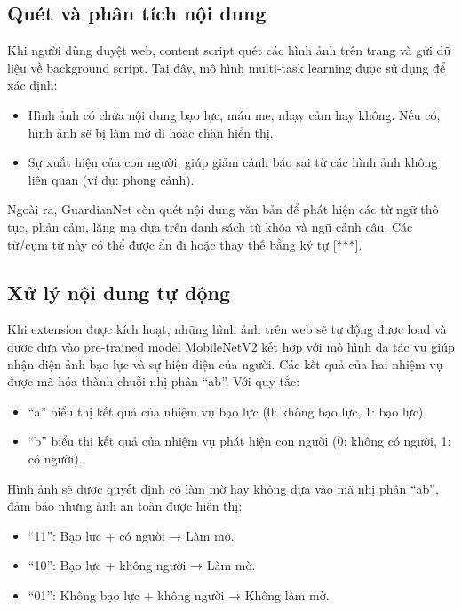\documentclass[12pt,a4paper]{article}
\begin{document}
\subsection{Quét và phân tích nội dung}

Khi người dùng duyệt web, content script quét các hình ảnh trên trang và gửi dữ liệu về background script. Tại đây, mô hình multi-task learning được sử dụng để xác định:

\begin{itemize}
  \item Hình ảnh có chứa nội dung bạo lực, máu me, nhạy cảm hay không. Nếu có, hình ảnh sẽ bị làm mờ đi hoặc chặn hiển thị.
  
  \item Sự xuất hiện của con người, giúp giảm cảnh báo sai từ các hình ảnh không liên quan (ví dụ: phong cảnh).
\end{itemize}

Ngoài ra, GuardianNet còn quét nội dung văn bản để phát hiện các từ ngữ thô tục, phản cảm, lăng mạ dựa trên danh sách từ khóa và ngữ cảnh câu. Các từ/cụm từ này có thể được ẩn đi hoặc thay thế bằng ký tự [***].

\subsection{Xử lý nội dung tự động}

Khi extension được kích hoạt, những hình ảnh trên web sẽ tự động được load và được đưa vào pre-trained model MobileNetV2 kết hợp với mô hình đa tác vụ giúp nhận diện ảnh bạo lực và sự hiện diện của người. Các kết quả của hai nhiệm vụ được mã hóa thành chuỗi nhị phân ``ab''. Với quy tắc:

\begin{itemize}
  \item ``a'' biểu thị kết quả của nhiệm vụ bạo lực (0: không bạo lực, 1: bạo lực).
  
  \item ``b'' biểu thị kết quả của nhiệm vụ phát hiện con người (0: không có người, 1: có người). 
\end{itemize}

Hình ảnh sẽ được quyết định có làm mờ hay không dựa vào mã nhị phân ``ab'', đảm bảo những ảnh an toàn được hiển thị:

\begin{itemize}
  \item ``11'': Bạo lực + có người → Làm mờ.
  
  \item ``10'': Bạo lực + không người → Làm mờ.
  
  \item ``01'': Không bạo lực + không người → Không làm mờ.
\end{itemize}
\end{document}
